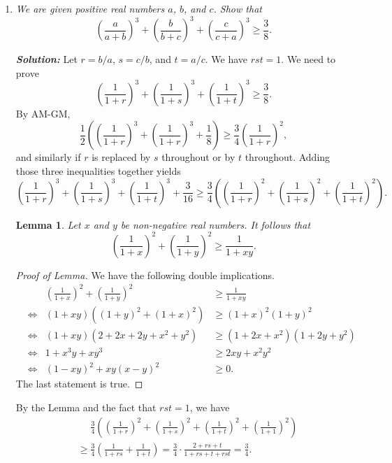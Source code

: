\documentclass[11pt]{article}
\newtheorem{lemma}[]{Lemma}
\newcommand{\sol}[0]{\textbf{\textit{Solution: }}}
\begin{document}
\begin{enumerate}

\item \textit{We are given positive real numbers \(a\), \(b\), and \(c\). Show that
\[\left(\frac{a}{a + b}\right)^{3} + \left(\frac{b}{b + c}\right)^{3} + \left(\frac{c}{c + a}\right)^{3} \geqslant \frac{3}{8}.\]}

\sol Let \(r = b/a\), \(s = c/b\), and \(t = a/c\). We have \(rst = 1\). We need to prove
\[\left(\frac{1}{1 + r}\right)^{3} + \left(\frac{1}{1 + s}\right)^{3} + \left(\frac{1}{1 + t}\right)^{3} \geqslant \frac{3}{8}.\]
By AM-GM,
\[\frac{1}{2}\left(\left(\frac{1}{1 + r}\right)^{3} + \left(\frac{1}{1 + r}\right)^{3} + \frac{1}{8}\right) \geqslant \frac{3}{4}\left(\frac{1}{1 + r}\right)^{2},\]
and similarly if \(r\) is replaced by \(s\) throughout or by \(t\) throughout. Adding those three inequalities together yields
\[\left(\frac{1}{1 + r}\right)^{3} + \left(\frac{1}{1 + s}\right)^{3} + \left(\frac{1}{1 + t}\right)^{3} + \frac{3}{16} \geqslant \frac{3}{4}\left(\left(\frac{1}{1 + r}\right)^{2} + \left(\frac{1}{1 + s}\right)^{2} + \left(\frac{1}{1 + t}\right)^{2}\right).\]

\begin{lemma}
Let \(x\) and \(y\) be non-negative real numbers. It follows that
\[\left(\frac{1}{1 + x}\right)^{2} + \left(\frac{1}{1 + y}\right)^{2} \geqslant \frac{1}{1 + xy}.\]
\end{lemma}
\begin{proof}[Proof of Lemma]
We have the following double implications.
\[\begin{aligned}
& & \left(\frac{1}{1 + x}\right)^{2} + \left(\frac{1}{1 + y}\right)^{2} & \geqslant \frac{1}{1 + xy}\\
& \iff & (1 + xy)((1 + y)^{2} + (1 + x)^{2}) & \geqslant (1 + x)^{2}(1 + y)^{2}\\
& \iff & (1 + xy)(2 + 2x + 2y + x^{2} + y^{2}) & \geqslant (1 + 2x + x^{2})(1 + 2y + y^{2})\\
& \iff & 1 + x^{3}y + xy^{3} & \geqslant 2xy + x^{2}y^{2}\\
& \iff & (1 - xy)^{2} + xy(x - y)^{2} & \geqslant 0.
\end{aligned}\]
The last statement is true.
\end{proof}

By the Lemma and the fact that \(rst = 1\), we have
\begin{align*}
    &\mspace{24mu} \frac{3}{4}\left(\left(\frac{1}{1 + r}\right)^{2} + \left(\frac{1}{1 + s}\right)^{2} + \left(\frac{1}{1 + t}\right)^{2} + \left(\frac{1}{1 + 1}\right)^{2}\right) \\
    &\geqslant \frac{3}{4}\left(\frac{1}{1 + rs} + \frac{1}{1 + t}\right) = \frac{3}{4}\cdot\frac{2 + rs + t}{1 + rs + t + rst} = \frac{3}{4}.
\end{align*}


\end{enumerate}
\end{document}
